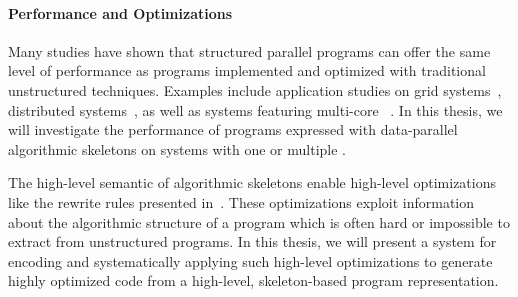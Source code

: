 \paragraph{Performance and Optimizations}
Many studies have shown that structured parallel programs can offer the same level of performance as programs implemented and optimized with traditional unstructured techniques.
Examples include application studies on grid systems~\cite{Alt2007}, distributed systems~\cite{CiechanowiczKSGK09}, as well as systems featuring multi-core \CPUs~\cite{AldinucciMT10}.
In this thesis, we will investigate the performance of programs expressed with data-parallel algorithmic skeletons on systems with one or multiple \GPUs.

The high-level semantic of algorithmic skeletons enable high-level optimizations like the rewrite rules presented in~\cite{Gorlatch00}.
These optimizations exploit information about the algorithmic structure of a program which is often hard or impossible to extract from unstructured programs.
In this thesis, we will present a system for encoding and systematically applying such high-level optimizations to generate highly optimized code from a high-level, skeleton-based program representation.

